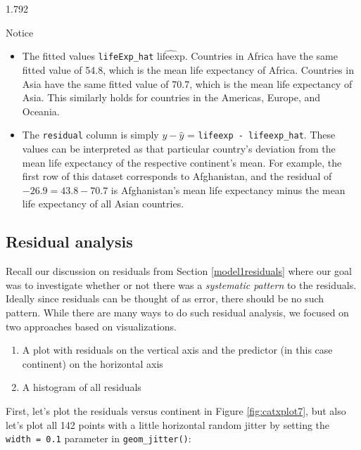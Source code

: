 \documentclass[12pt,]{krantz}
\providecommand{\tightlist}{%
  \setlength{\itemsep}{0pt}\setlength{\parskip}{0pt}}
\begin{document}
1.792

Notice

\begin{itemize}
\tightlist
\item
  The fitted values \texttt{lifeExp\_hat} \(\widehat{\text{lifeexp}}\).
  Countries in Africa have the same fitted value of 54.8, which is the
  mean life expectancy of Africa. Countries in Asia have the same fitted
  value of 70.7, which is the mean life expectancy of Asia. This
  similarly holds for countries in the Americas, Europe, and Oceania.
\item
  The \texttt{residual} column is simply \(y - \widehat{y}\) =
  \texttt{lifeexp\ -\ lifeexp\_hat}. These values can be interpreted as
  that particular country's deviation from the mean life expectancy of
  the respective continent's mean. For example, the first row of this
  dataset corresponds to Afghanistan, and the residual of
  \(-26.9 = 43.8 - 70.7\) is Afghanistan's mean life expectancy minus
  the mean life expectancy of all Asian countries.
\end{itemize}

\subsection{Residual analysis}\label{model2residuals}

Recall our discussion on residuals from Section \ref{model1residuals}
where our goal was to investigate whether or not there was a
\emph{systematic pattern} to the residuals. Ideally since residuals can
be thought of as error, there should be no such pattern. While there are
many ways to do such residual analysis, we focused on two approaches
based on visualizations.

\begin{enumerate}
\def\labelenumi{\arabic{enumi}.}
\tightlist
\item
  A plot with residuals on the vertical axis and the predictor (in this
  case continent) on the horizontal axis
\item
  A histogram of all residuals
\end{enumerate}

First, let's plot the residuals versus continent in Figure
\ref{fig:catxplot7}, but also let's plot all 142 points with a little
horizontal random jitter by setting the \texttt{width\ =\ 0.1} parameter
in \texttt{geom\_jitter()}:
\end{document}
